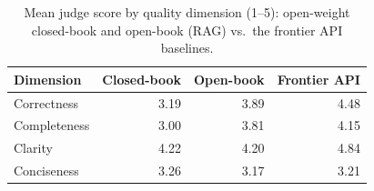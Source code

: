 \begin{table}[t]\centering\footnotesize
\caption{Mean judge score by quality dimension (1--5): open-weight closed-book and open-book (RAG) vs.\ the frontier API baselines.}
\label{tab:bydim}
\begin{tabular}{@{}lrrr@{}}
\toprule
Dimension & Closed-book & Open-book & Frontier API \\ \midrule
Correctness & 3.19 & 3.89 & 4.48 \\
Completeness & 3.00 & 3.81 & 4.15 \\
Clarity & 4.22 & 4.20 & 4.84 \\
Conciseness & 3.26 & 3.17 & 3.21 \\
\bottomrule
\end{tabular}
\end{table}
